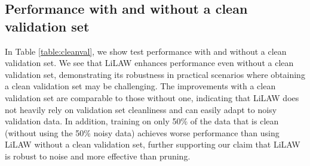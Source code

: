 \documentclass{article}
\theoremstyle{plain}
\theoremstyle{definition}
\theoremstyle{remark}
\begin{document}
\subsection{Performance with and without a clean validation set}
\label{supp:cleanvalset}

In Table \ref{table:cleanval}, we show test performance with and without a clean validation set. We see that LiLAW enhances performance even without a clean validation set, demonstrating its robustness in practical scenarios where obtaining a clean validation set may be challenging. The improvements with a clean validation set are comparable to those without one, indicating that LiLAW does not heavily rely on validation set cleanliness and can easily adapt to noisy validation data. In addition, training on only 50\% of the data that is clean (without using the 50\% noisy data) achieves worse performance than using LiLAW without a clean validation set, further supporting our claim that LiLAW is robust to noise and more effective than pruning.
\end{document}
